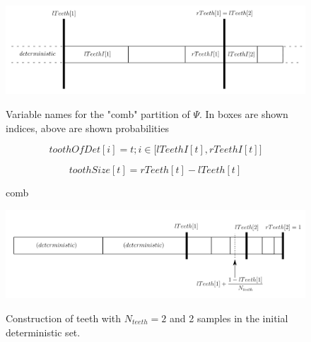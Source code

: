 \documentclass[./thesis.tex]{subfiles}
\begin{document}
\begin{figure}[h!]
	\label{comb_variables}
	\begin{center}
		\includegraphics[width=1.00\columnwidth]{figures/pt2/teeth}
		\caption{comb}
		Variable names for the "comb" partition of $\Psi$. In boxes are shown indices, above are shown probabilities
		
\begin{equation}
toothOfDet[i] = t ; i \in \big [ lTeethI[t],rTeethI[t] \big ]
\end{equation}

		
\begin{equation}
toothSize[t] = rTeeth[t] - lTeeth[t]
\end{equation}

	\end{center}
\end{figure}

\begin{figure}[h!]
	\begin{center}
		\includegraphics[width=1.00\columnwidth]{figures/pt2/teeths}
		\caption{\label{filtering}}
		Construction of teeth with $N_{teeth} = 2$ and 2 samples in the initial deterministic set.
	\end{center}
\end{figure}
\end{document}
